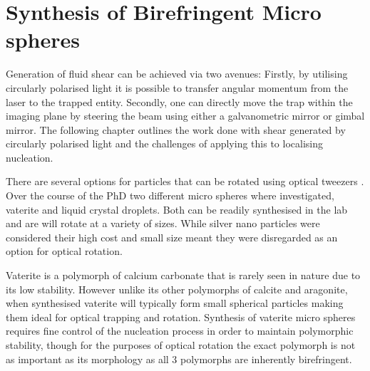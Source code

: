 \section{Synthesis of Birefringent Micro spheres}
\label{sec:vaterite}
Generation of fluid shear can be achieved via two avenues: Firstly, by 
utilising circularly polarised light it is possible to transfer angular 
momentum from the laser to the trapped entity. Secondly, one can 
directly move the trap within the imaging plane by steering the beam 
using either a galvanometric mirror or gimbal mirror. The following 
chapter outlines the work done with shear generated by circularly 
polarised light and the challenges of applying this to localising 
nucleation. 

There are several options for particles that can be rotated using 
optical tweezers \cite{Parkin2009, Saito2022}. Over the course of 
the PhD two different micro spheres where investigated, vaterite 
and liquid crystal droplets. Both can be readily synthesised in 
the lab and are will rotate at a variety of sizes. While silver 
nano particles were considered their high cost and small size 
meant they were disregarded as an option for optical rotation. 

Vaterite is a polymorph of calcium carbonate that is rarely seen in 
nature due to its low stability. However unlike its other polymorphs of 
calcite and aragonite, when synthesised vaterite will typically form 
small spherical particles making them ideal for optical trapping and rotation. 
Synthesis of vaterite micro spheres requires fine control of the nucleation
process in order to maintain polymorphic stability, though for the purposes
of optical rotation the exact polymorph is not as important as its morphology
as all 3 polymorphs are inherently birefringent. 


